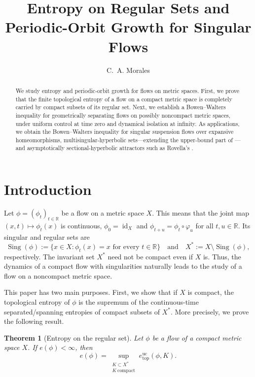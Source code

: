 \documentclass[11pt,reqno]{amsart}
\title[Entropy and periodic-orbit growth]
{Entropy on Regular Sets and Periodic-Orbit Growth for Singular Flows}
\author{C.~A. Morales}
\newtheorem{theorem}{Theorem}[section]
\theoremstyle{definition}
\theoremstyle{remark}
\newcommand{\id}{\operatorname{id}}
\newcommand{\R}{\mathbb{R}}
\newcommand{\Sing}{\operatorname{Sing}}
\newcommand{\hE}{e^{\mathrm{uc}}_{\mathrm{top}}}
\begin{document}
\begin{abstract}
We study entropy and periodic-orbit growth for flows on metric spaces.
First, we prove that the finite topological entropy of a flow on a compact
metric space is completely carried by compact subsets of its regular set.
Next, we establish a Bowen--Walters inequality for geometrically separating
flows on possibly noncompact metric spaces, under uniform control at time
zero and dynamical isolation at infinity.  As applications, we obtain the Bowen--Walters inequality for singular
suspension flows over expansive homeomorphisms,
multisingular-hyperbolic sets---extending the upper-bound part of
\cite{pyyz}---and asymptotically sectional-hyperbolic attractors such
as Rovella's \cite{r}.
\end{abstract}

\maketitle

\section{Introduction}





\noindent
Let $\phi=(\phi_t)_{t\in\mathbb R}$
be a flow on a metric space $X$. This means that the joint map $(x,t)\mapsto \phi_t(x)$ is continuous, $\phi_0=\id_X$ and
$\phi_{t+u}=\phi_t\circ\varphi_u$ for all $t,u\in\R$.
Its singular and regular sets are
\[
 \Sing(\phi)
 :=\{x\in X:\phi_t(x)=x\text{ for every }t\in\R\}
 \quad\text{and}\quad
 X^*:=X\setminus\Sing(\phi),
\]
respectively.  The invariant set $X^*$ need not be
compact even if $X$ is.  Thus, the dynamics of a compact flow with singularities naturally
leads to the study of a flow on a noncompact metric space.

This paper has two main purposes.  First, we show that if $X$ is compact, the topological entropy of $\phi$ is the supremum of the continuous-time
separated/spanning entropies of compact subsets of $X^*$.
More precisely, we prove the following result.

\begin{theorem}[Entropy on the regular set]
\label{thmA}
Let $\phi$ be a flow of a compact metric space $X$.
If $e(\phi)<\infty$, then
\[
 e(\phi)
 =
 \sup_{\substack{K\subset X^*\\K\ \mathrm{compact}}}
 \hE(\phi,K).
\]
\end{theorem}
\end{document}
